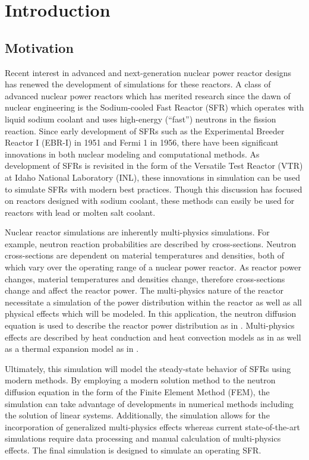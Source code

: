 \chapter{Introduction}
\label{ch:introduction}

\section{Motivation}
  Recent interest in advanced and next-generation nuclear power reactor designs
  has renewed the development of simulations for these reactors. A class of
  advanced nuclear power reactors which has merited research since the dawn of
  nuclear engineering is the Sodium-cooled Fast Reactor (SFR) which operates 
  with liquid sodium coolant and uses high-energy (``fast'') neutrons in the
  fission reaction. Since early development of SFRs such as the Experimental
  Breeder Reactor I (EBR-I) in 1951 and Fermi 1 in 1956, there have been
  significant innovations in both nuclear modeling and computational methods. As
  development of SFRs is revisited in the form of the Versatile Test Reactor
  (VTR) at Idaho National Laboratory (INL), these innovations in simulation can
  be used to simulate SFRs with modern best practices.
  Though this discussion has focused on reactors designed with sodium coolant,
  these methods can easily be used for reactors with lead or molten salt
  coolant.

  Nuclear reactor simulations are inherently multi-physics simulations. For
  example, neutron reaction probabilities are described by cross-sections.
  Neutron cross-sections are dependent on material temperatures and densities,
  both of which vary over the operating range of a nuclear power reactor. As
  reactor power changes, material temperatures and densities change, therefore
  cross-sections change and affect the reactor power. The multi-physics nature
  of the reactor necessitate a simulation of the power distribution within the
  reactor as well as all physical effects which will be modeled. In this
  application, the neutron diffusion equation is used to describe the reactor
  power distribution as in . Multi-physics effects
  are described by heat conduction and heat convection models as in
   as well as a thermal expansion model as in
  .

  Ultimately, this simulation will model the steady-state behavior of SFRs using
  modern methods. By employing a modern solution method to the neutron diffusion
  equation in the form of the Finite Element Method (FEM), the simulation can
  take advantage of developments in numerical methods including the solution of
  linear systems. Additionally, the simulation allows for the incorporation of
  generalized multi-physics effects whereas current state-of-the-art simulations
  require data processing and manual calculation of multi-physics effects. The
  final simulation is designed to simulate an operating SFR.

